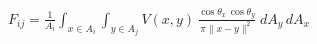 \documentclass[border=6pt]{standalone}
\begin{document}
\color{black}
\(\displaystyle
F_{ij}
=
\frac{1}{A_i}
\int_{x\in A_i}
\int_{y\in A_j}
V(x,y)\,
\frac{\cos\theta_x\,\cos\theta_y}{\pi \lVert x-y\rVert^2}
\;dA_y\,dA_x
\)
\end{document}
